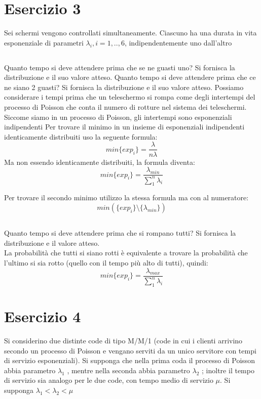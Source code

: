 \documentclass[a4paper]{article}
\begin{document}
\section{Esercizio 3}
Sei schermi vengono controllati simultaneamente. Ciascuno ha una durata in vita esponenziale di parametri $\lambda_i , i = 1, .., 6$, indipendentemente uno dall’altro
\subsection{}
Quanto tempo si deve attendere prima che se ne guasti uno? Si fornisca la distribuzione e il suo valore atteso. Quanto tempo si deve attendere prima che ce ne siano 2 guasti? Si fornisca la distribuzione e il suo valore atteso.
Possiamo considerare i tempi prima che un teleschermo si rompa come degli intertempi del processo di Poisson che conta il numero di rotture nel sistema dei teleschermi.
Siccome siamo in un processo di Poisson, gli intertempi sono esponenziali indipendenti
Per trovare il minimo in un insieme di esponenziali indipendenti identicamente distribuiti uso la seguente formula:
$$min\{exp_i\}= \frac{\lambda}{n \lambda}$$
Ma non essendo identicamente distribuiti, la formula diventa:
$$min\{exp_i\}= \frac{\lambda_{min}}{\sum_1^n \lambda_i}$$

Per trovare il secondo minimo utilizzo la stessa formula ma con al numeratore:  
$$min(\{exp_i\}\setminus \{\lambda_{min}\}) $$

\subsection{}
Quanto tempo si deve attendere prima che si rompano tutti? Si fornisca la distribuzione e il valore atteso.\\

La probabilità che tutti si siano rotti è equivalente a trovare la probabilità che l'ultimo si sia rotto (quello con il tempo più alto di tutti), quindi:
$$min\{exp_i\}= \frac{\lambda_{max}}{\sum_1^n \lambda_i}$$



\section{Esercizio 4}
Si considerino due distinte code di tipo M/M/1 (code in cui i clienti arrivino secondo un processo di Poisson e vengano serviti da un unico servitore con tempi di servizio esponenziali).
Si supponga che nella prima coda il processo di Poisson abbia parametro $\lambda_1$ , mentre nella seconda abbia parametro $\lambda_2$ ; inoltre il tempo di servizio sia analogo per le due code, con tempo medio di servizio $\mu$. Si supponga $\lambda_1 < \lambda_2 < \mu$
\end{document}
